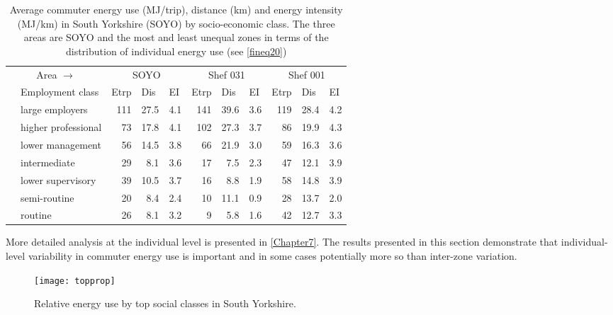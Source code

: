 \begin{table}[htbp]
\caption[Commuter energy use in South Yorkshire areas by class]
{Average commuter energy use (MJ/trip), distance (km) and energy intensity (MJ/km)
in South Yorkshire (SOYO) by socio-economic class.
The three areas are SOYO and the most and least
unequal zones in terms of the distribution of individual energy use (see
\cref{fineq20})}
\begin{tabular}{rl|rrr|rrr|rrr}
\toprule
\multicolumn{2}{c}{Area $\rightarrow$} &  \multicolumn{3}{|c|}{SOYO}  & \multicolumn{3}{c}{Shef 031} & \multicolumn{3}{|c}{Shef 001} \\
\multicolumn{1}{l}{} & Employment class & \multicolumn{1}{l}{Etrp} & \multicolumn{1}{l}{Dis} & \multicolumn{1}{l}{EI} & \multicolumn{1}{|l}{Etrp} & \multicolumn{1}{l}{Dis} & \multicolumn{1}{l}{EI} & \multicolumn{1}{|l}{Etrp} & \multicolumn{1}{l}{Dis} & \multicolumn{1}{l}{EI } \\
\midrule
 & large employers  & 111 & 27.5 & 4.1 & 141 & 39.6 & 3.6 & 119 & 28.4 & 4.2 \\
 & higher professional & 73 & 17.8 & 4.1 & 102 & 27.3 & 3.7 & 86 & 19.9 & 4.3 \\
 & lower management  & 56 & 14.5 & 3.8 & 66 & 21.9 & 3.0 & 59 & 16.3 & 3.6 \\
 & intermediate & 29 & 8.1 & 3.6 & 17 & 7.5 & 2.3 & 47 & 12.1 & 3.9 \\
 & lower supervisory  & 39 & 10.5 & 3.7 & 16 & 8.8 & 1.9 & 58 & 14.8 & 3.9 \\
 & semi-routine & 20 & 8.4 & 2.4 & 10 & 11.1 & 0.9 & 28 & 13.7 & 2.0 \\
 & routine & 26 & 8.1 & 3.2 & 9 & 5.8 & 1.6 & 42 & 12.7 & 3.3 \\
 \bottomrule
\end{tabular}
\label{tindenergy}
\end{table}

More detailed analysis at the individual
level is presented in \cref{Chapter7}. The results presented in this section
demonstrate that individual-level variability in commuter energy use
is important and in some cases potentially more so than inter-zone variation.



\begin{figure}[htbp]
\begin{center}
    \texttt{[image: topprop]}  \end{center}
  \caption[Relative energy use by top social classes]
  {Relative energy use by top social classes in South Yorkshire.}
 \label{ftopprop}
\end{figure}

